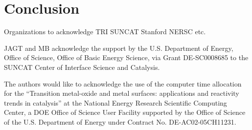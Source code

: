 \documentclass[journal=jacsat,manuscript=article]{achemso}
\begin{document}

\section{Conclusion}



\begin{acknowledgement}

Organizations to acknowledge
TRI
SUNCAT
Stanford
NERSC
etc.

JAGT and MB acknowledge the support by the U.S. Department of Energy, Office
of Science, Office of Basic Energy Science, via Grant DE-SC0008685 to the
SUNCAT Center of Interface Science and Catalysis.

The authors would like to acknowledge the use of the computer time allocation
for the “Transition metal-oxide and metal surfaces: applications and
reactivity trends in catalysis” at the National Energy Research Scientific
Computing Center, a DOE Office of Science User Facility supported by the
Office of Science of the U.S. Department of Energy under Contract No.
DE-AC02-05CH11231.

\end{acknowledgement}


  \clearpage
  \appendix
  \renewcommand{\thefigure}{S\arabic{figure}}
  \setcounter{figure}{0}
  \renewcommand{\thetable}{S\arabic{table}}
  \setcounter{table}{0}

  \begin{suppinfo}
  
  \end{suppinfo}


\end{document}
